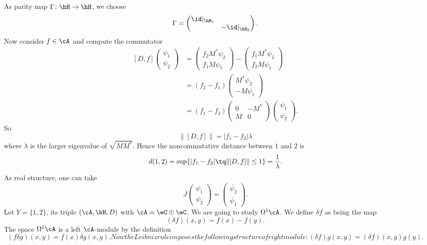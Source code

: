 As parity map $\Gamma\colon \hH\to \hH$, we choose
\[
	\Gamma=\begin{pmatrix}
		\id|_{\hH_1} \\ &-\id|_{\hH_2}
	\end{pmatrix}.
\]
Now consider $f\in\cA$ and compute the commutator
\[
	\begin{split}
		[D,f]\begin{pmatrix}
			\psi_1 \\\psi_2
		\end{pmatrix}
		&=
		\begin{pmatrix}
			f_2 M^*\psi_2 \\f_1M\psi_1
		\end{pmatrix}
		-
		\begin{pmatrix}
			f_1M^*\psi_2 \\f_2M\psi_1
		\end{pmatrix}\\
		&=(f_2-f_1)\begin{pmatrix}
			M^*\psi_2 \\-M\psi_1
		\end{pmatrix}\\
		&=(f_1-f_2)\begin{pmatrix}
			0 & -M^* \\M&0
		\end{pmatrix}
		\begin{pmatrix}
			\psi_1 \\\psi_2
		\end{pmatrix}.
	\end{split}
\]
So
\[
	\| [D,f] \|=| f_1-f_2 |\lambda
\]
where $\lambda$ is the larger eigenvalue of $\sqrt{MM^*}$. Hence the noncommutative distance between $1$ and $2$ is
\[
	d(1,2)=\sup\{ | f_1-f_2 |\tq \| [D,f] \|\leq 1 \}=\frac{1}{ \lambda }.
\]
As real structure, one can take
\[
	J\begin{pmatrix}
		\psi_1 \\\psi_2
	\end{pmatrix}=
	\begin{pmatrix}
		\overline{ \psi_2 } \\\overline{ \psi_1 }
	\end{pmatrix}.
\]
Let $Y=\{ 1,2 \}$, its triple $(\cA,\hH,D)$ with $\cA=\eC\oplus\eC$. We are going to study $\Omega^1\cA$. We define $\delta f$ as being the map
\begin{equation}
	(\delta f)(x,y)=f(x)-f(y).
\end{equation}
The space $\Omega^1\cA$ is a left $\cA$-module by the definition
\begin{subequations}
	\begin{equation}
		(f\delta g)(x,y)=f(x)\delta g(x,y).          \label{SubEqfdeltagxya}
	\end{equation}
	Now the Leibniz rule imposes the following structure of right module:
	\begin{equation}
		(\delta f)g(x,y)=(\delta f)(x,y)g(y).   \label{SubEqfdeltagxyb}
	\end{equation}
\end{subequations}
